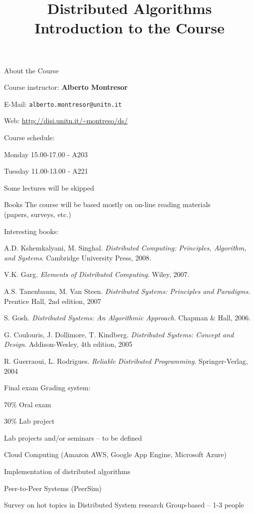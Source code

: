\title[DS - Introduction]{\textbf{Distributed Algorithms}\\Introduction to the Course}



\begin{frame}
\titlepage
\end{frame}

\begin{frame}{About the Course}

Course instructor: \textbf{Alberto Montresor}
\BI
\item E-Mail: \texttt{alberto.montresor@unitn.it}
\item Web: \url{http://disi.unitn.it/~montreso/ds/}
\EI


\bigskip
Course schedule:
\BI
\item Monday 15.00-17.00 - A203
\item Tuesday 11.00-13.00 - A221
\item Some lectures will be skipped
\EI

\end{frame}


\begin{frame}{Books}
The course will be based mostly on on-line reading materials\\ (papers, surveys, etc.)

\bigskip
Interesting books:
{\small 
\BI
\item A.D. Kshemkalyani, M. Singhal. \emph{Distributed Computing: Principles, Algorithm, and Systems}. Cambridge University Press, 2008.
\item V.K. Garg. \emph{Elements of Distributed Computing}. Wiley, 2007.
\item A.S. Tanenbaum, M. Van Steen. \emph{Distributed Systems: Principles and Paradigms}. Prentice Hall, 2nd edition, 2007
\item S. Gosh. \emph{Distributed Systems: An Algorithmic Approach}. Chapman \& Hall, 2006.
\item G. Coulouris, J. Dollimore, T. Kindberg. \emph{Distributed Systems: Concept and Design}. Addison-Wesley, 4th edition, 2005
\item R. Guerraoui, L. Rodrigues. \emph{Reliable Distributed Programming}. Springer-Verlag, 2004
\EI	
}
\end{frame}

\begin{frame}{Final exam}
Grading system:
\BI
\item 70\% Oral exam
\item 30\% Lab project
\EI	
	
\bigskip
Lab projects and/or seminars -- to be defined
\BI
\item Cloud Computing (Amazon AWS, Google App Engine, Microsoft Azure)
\item Implementation of distributed algorithms
\item Peer-to-Peer Systems (PeerSim)
\item Survey on hot topics in Distributed System research
\EI
\bigskip
Group-based -- 1-3 people

\end{frame}

 

